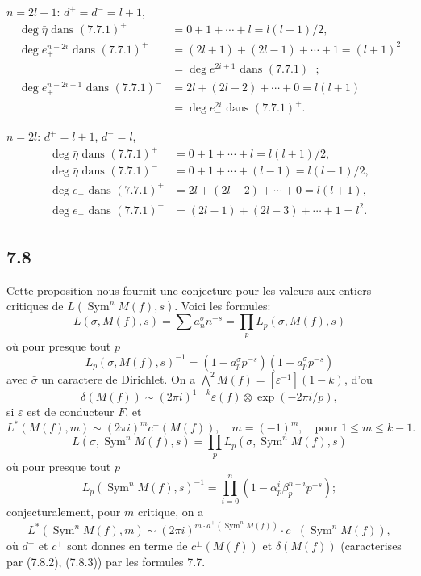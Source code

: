 \documentclass[12pt,a4paper]{article}
\theoremstyle{plain}
\theoremstyle{definition}
\theoremstyle{remark}
\DeclareMathOperator{\Sym}{Sym}
\begin{document}
$n = 2l+1$: $d^+ = d^- = l+1$,
\begin{align*}
\deg \bar{\eta} \text{ dans } (7.7.1)^+ &= 0 + 1 + \cdots + l = l(l+1)/2,\\
\deg e_+^{n-2i} \text{ dans } (7.7.1)^+ &= (2l+1) + (2l-1) + \cdots + 1 = (l+1)^2\\
&= \deg e_-^{2i+1} \text{ dans } (7.7.1)^-;\\
\deg e_+^{n-2i-1} \text{ dans } (7.7.1)^- &= 2l + (2l-2) + \cdots + 0 = l(l+1)\\
&= \deg e_-^{2i} \text{ dans } (7.7.1)^+.
\end{align*}

$n = 2l$: $d^+ = l+1$, $d^- = l$,
\begin{align*}
\deg \bar{\eta} \text{ dans } (7.7.1)^+ &= 0 + 1 + \cdots + l = l(l+1)/2,\\
\deg \bar{\eta} \text{ dans } (7.7.1)^- &= 0 + 1 + \cdots + (l-1) = l(l-1)/2,\\
\deg e_+ \text{ dans } (7.7.1)^+ &= 2l + (2l-2) + \cdots + 0 = l(l+1),\\
\deg e_+ \text{ dans } (7.7.1)^- &= (2l-1) + (2l-3) + \cdots + 1 = l^2.
\end{align*}

\subsection*{7.8}

Cette proposition nous fournit une conjecture pour les valeurs aux entiers
critiques de $L(\Sym^n M(f), s)$. Voici les formules:
\begin{equation}\label{eq:7.8.1}
L(\sigma, M(f), s) = \sum a_n^\sigma n^{-s} = \prod_p L_p(\sigma, M(f), s)
\end{equation}
o\`u pour presque tout $p$
\[
L_p(\sigma, M(f), s)^{-1} = (1 - a_p^\sigma p^{-s})(1 - \bar{a}_p^\sigma p^{-s})
\]
avec $\bar{\sigma}$ un caractere de Dirichlet. On a $\bigwedge^2 M(f) = [\varepsilon^{-1}](1-k)$, d'ou
\begin{equation}\label{eq:7.8.2}
\delta(M(f)) \sim (2\pi i)^{1-k} \varepsilon(f) \otimes \exp(-2\pi i/p),
\end{equation}
si $\varepsilon$ est de conducteur $F$, et
\begin{equation}\label{eq:7.8.3}
L^*(M(f), m) \sim (2\pi i)^m c^+(M(f)), \quad m = (-1)^m, \quad \text{pour } 1 \leq m \leq k-1.
\end{equation}
\begin{equation}\label{eq:7.8.4}
L(\sigma, \Sym^n M(f), s) = \prod_p L_p(\sigma, \Sym^n M(f), s)
\end{equation}
o\`u pour presque tout $p$
\[
L_p(\Sym^n M(f), s)^{-1} = \prod_{i=0}^n (1 - \alpha_p^i \beta_p^{n-i} p^{-s});
\]
conjecturalement, pour $m$ critique, on a
\[
L^*(\Sym^n M(f), m) \sim (2\pi i)^{m \cdot d^+(\Sym^n M(f))} \cdot c^+(\Sym^n M(f)),
\]
o\`u $d^+$ et $c^+$ sont donnes en terme de $c^\pm(M(f))$ et $\delta(M(f))$ (caracterises
par (7.8.2), (7.8.3)) par les formules 7.7.
\end{document}
